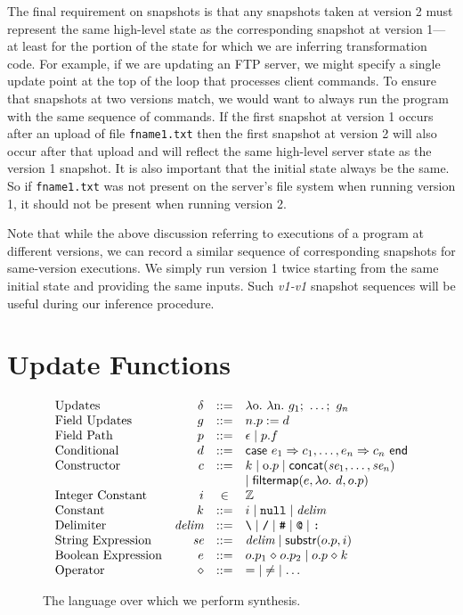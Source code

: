 The final requirement on snapshots is that any snapshots taken at version 2 must represent the same high-level state as the corresponding snapshot at version 1---at least for the portion of the state for which we are inferring transformation code.  For example, if we are updating an FTP server, we might specify a single update point at the top of the loop that processes client commands.  To ensure that snapshots at two versions match, we would want to always run the program with the same sequence of commands.  If the first snapshot at version 1 occurs after an upload of file \texttt{fname1.txt} then the first snapshot at version 2 will also occur after that upload and will reflect the same high-level server state as the version 1 snapshot.  It is also important that the initial state always be the same.  So if \texttt{fname1.txt} was not present on the server's file system when running version 1, it should not be present when running version 2.

Note that while the above discussion referring to executions of a program at different versions, we can record a similar sequence of corresponding snapshots for same-version executions.  We simply run version 1 twice starting from the same initial state and providing the same inputs.  Such \emph{v1-v1} snapshot sequences will be useful during our inference procedure.

\section{Update Functions}

\begin{figure}
\small
\[
\begin{array}{lrcl}
\text{Updates} & \delta & \mathrel{::=} & \lambda \textrm{o}.\ \lambda \textrm{n}.\ g_1;\ \ldots;\ g_n\\
\text{Field Updates} & g & \mathrel{::=} & n.p := d \\
\text{Field Path} & p & \mathrel{::=} & \epsilon \mid p.f \\
\text{Conditional} & d & \mathrel{::=} & \textsf{case } e_1 \Rightarrow c_1, \ldots, e_n \Rightarrow c_n \textsf{ end} \\
\text{Constructor} & c & \mathrel{::=} & k \mid \textrm{o}.p \mid \textsf{concat}(\textit{se}_1,\ldots,\textit{se}_n) \\
& & & \mid \textsf{filtermap}(e,\lambda o.\ d, o.p) \\
\text{Integer Constant} & i & \in & \mathbb{Z} \\
\text{Constant} & k & \mathrel{::=} & i \mid \texttt{null} \mid \textit{delim} \\
\text{Delimiter} & \textit{delim} & \mathrel{::=} & \texttt{\textbackslash} \mid \texttt{/} \mid \texttt{\#} \mid \texttt{@} \mid \texttt{:} \\
\text{String Expression} & \textit{se} & \mathrel{::=} & \textit{delim} \mid \textsf{substr}(o.p,i)\\
\text{Boolean Expression} & e & \mathrel{::=} & o.p_1 \mathrel{\diamond} o.p_2 \mid o.p \mathrel{\diamond} k \\
\text{Operator} & \mathrel{\diamond} & \mathrel{::=} & \mathord{=} \mid \mathord{\neq} \mid \ldots
\end{array}
\]
\caption{\label{fig:language}The language over which we perform synthesis.}
\end{figure}

